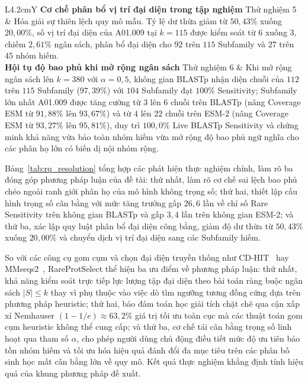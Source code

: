 \begin{table}[htbp!]
\begin{tabularx}{\textwidth}{L{4.2cm}Y}
\addlinespace
\textbf{Cơ chế phân bổ vị trí đại diện trong tập nghiệm} \newline Thử nghiệm 5 & Hóa giải sự thiên lệch quy mô mẫu. Tỷ lệ dư thừa giảm từ $50{,}43\%$ xuống $20{,}00\%$, số vị trí đại diện của A01.009 tại $k=115$ được kiểm soát từ $6$ xuống $3$, chiếm $2{,}61\%$ ngân sách, phân bổ đại diện cho $92$ trên $115$ Subfamily và $27$ trên $45$ nhóm hiếm. \\
\addlinespace
\textbf{Hội tụ độ bao phủ khi mở rộng ngân sách} \newline Thử nghiệm 6 & Khi mở rộng ngân sách lên $k = 380$ với $\alpha = 0{,}5$, không gian BLASTp nhận diện chuỗi của $112$ trên $115$ Subfamily ($97{,}39\%$) với $104$ Subfamily đạt $100\%$ Sensitivity; Subfamily lớn nhất A01.009 được tăng cường từ $3$ lên $6$ chuỗi trên BLASTp (nâng Coverage ESM từ $91{,}88\%$ lên $93{,}67\%$) và từ $4$ lên $22$ chuỗi trên ESM-2 (nâng Coverage ESM từ $93{,}27\%$ lên $95{,}81\%$), duy trì $100{,}0\%$ Live BLASTp Sensitivity và chứng minh khả năng vừa bảo toàn nhóm hiếm vừa mở rộng độ bao phủ ngữ nghĩa cho các phân họ lớn có biến dị nội nhóm rộng. \\
\bottomrule
\end{tabularx}
\end{table}

Bảng~\ref{tab:rq_resolution} tổng hợp các phát hiện thực nghiệm chính, làm rõ ba đóng góp phương pháp luận của đề tài: thứ nhất, làm rõ cơ chế sai lệch bao phủ chéo ngoài ranh giới phân họ của mô hình không trọng số; thứ hai, thiết lập cấu hình trọng số cân bằng với mức tăng trưởng gấp $26{,}6$ lần về chỉ số Rare Sensitivity trên không gian BLASTp và gấp $3{,}4$ lần trên không gian ESM-2; và thứ ba, xác lập quy luật phân bổ đại diện công bằng, giảm độ dư thừa từ $50{,}43\%$ xuống $20{,}00\%$ và chuyển dịch vị trí đại diện sang các Subfamily hiếm.

\label{subsec:method_comparison}

So với các công cụ gom cụm và chọn đại diện truyền thống như CD-HIT~\cite{cdhit} hay MMseqs2~\cite{mmseqs2}, RareProtSelect thể hiện ba ưu điểm về phương pháp luận: thứ nhất, khả năng kiểm soát trực tiếp lực lượng tập đại diện theo bài toán ràng buộc ngân sách $|S| \le k$ thay vì phụ thuộc vào việc dò tìm ngưỡng tương đồng cứng dựa trên phương pháp heuristic; thứ hai, bảo đảm toán học giải tích chặt chẽ qua cận xấp xỉ Nemhauser $(1 - 1/e) \approx 63{,}2\%$ giá trị tối ưu toàn cục mà các thuật toán gom cụm heuristic không thể cung cấp; và thứ ba, cơ chế tái cân bằng trọng số linh hoạt qua tham số $\alpha$, cho phép người dùng chủ động điều tiết mức độ ưu tiên bảo tồn nhóm hiếm và tối ưu hóa hiệu quả đánh đổi đa mục tiêu trên các phân bố sinh học mất cân bằng lớn về quy mô. Kết quả thực nghiệm khẳng định tính hiệu quả của khung phương pháp đề xuất.
